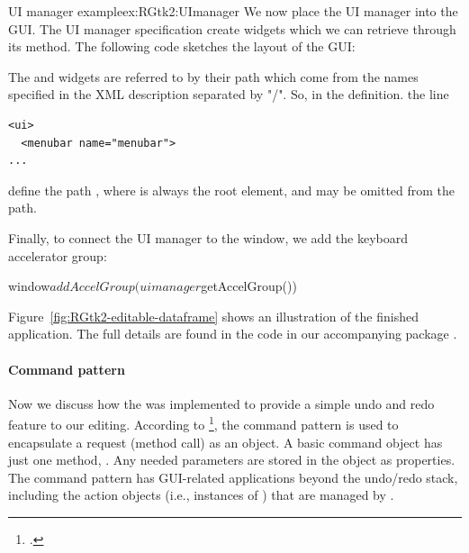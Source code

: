 \begin{example}{UI manager example}{ex:RGtk2:UImanager}
We now place the UI manager into the GUI. The UI manager specification
create widgets which we can retrieve through its
 method. The following code sketches
the layout of the GUI:
\begin{Schunk}
\end{Schunk}
%
The  and   widgets are referred to by
their path which come from the names specified in the XML description
separated by "/". So, in the definition. the line
\begin{verbatim}
<ui>
  <menubar name="menubar">
...
\end{verbatim}
define the path , where  is always
the root element, and may be omitted from the path.


Finally, to connect the UI manager to the window, we add the keyboard
accelerator group:
\begin{Schunk}
\begin{Sinput}
 window$addAccelGroup(uimanager$getAccelGroup())
\end{Sinput}
\end{Schunk}

Figure~\ref{fig:RGtk2-editable-dataframe} shows an illustration of the
finished application. The full details are found in the code in our accompanying
package . 

\paragraph{Command pattern}
Now we discuss how the 
was implemented to provide a simple undo and redo feature to our
editing.  According to \footcite{head-first-design-patterns}, the
command pattern is used to encapsulate a
request (method call) as an object. A basic command object has just
one method, . Any needed parameters are stored in the
object as properties. The command pattern has GUI-related applications
beyond the undo/redo stack, including the action objects (i.e.,
instances of ) that are managed by
.


\end{example}
